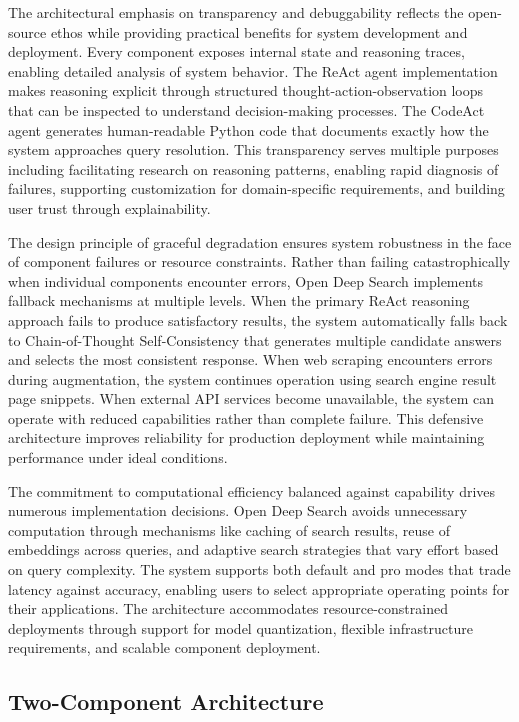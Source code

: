 The architectural emphasis on transparency and debuggability reflects the open-source ethos while providing practical benefits for system development and deployment. Every component exposes internal state and reasoning traces, enabling detailed analysis of system behavior. The ReAct agent implementation makes reasoning explicit through structured thought-action-observation loops that can be inspected to understand decision-making processes. The CodeAct agent generates human-readable Python code that documents exactly how the system approaches query resolution. This transparency serves multiple purposes including facilitating research on reasoning patterns, enabling rapid diagnosis of failures, supporting customization for domain-specific requirements, and building user trust through explainability.

The design principle of graceful degradation ensures system robustness in the face of component failures or resource constraints. Rather than failing catastrophically when individual components encounter errors, Open Deep Search implements fallback mechanisms at multiple levels. When the primary ReAct reasoning approach fails to produce satisfactory results, the system automatically falls back to Chain-of-Thought Self-Consistency that generates multiple candidate answers and selects the most consistent response. When web scraping encounters errors during augmentation, the system continues operation using search engine result page snippets. When external API services become unavailable, the system can operate with reduced capabilities rather than complete failure. This defensive architecture improves reliability for production deployment while maintaining performance under ideal conditions.

The commitment to computational efficiency balanced against capability drives numerous implementation decisions. Open Deep Search avoids unnecessary computation through mechanisms like caching of search results, reuse of embeddings across queries, and adaptive search strategies that vary effort based on query complexity. The system supports both default and pro modes that trade latency against accuracy, enabling users to select appropriate operating points for their applications. The architecture accommodates resource-constrained deployments through support for model quantization, flexible infrastructure requirements, and scalable component deployment.

\subsection{Two-Component Architecture}

